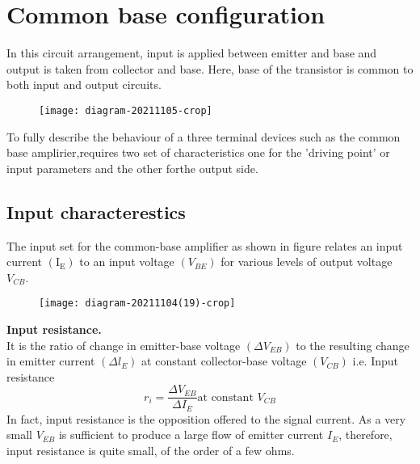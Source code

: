  \section{Common base configuration}
 In this circuit arrangement, input is applied between emitter and base and output is taken from collector and base. Here, base of the transistor is common to both input and output circuits.\\
\begin{figure}[H]
	\centering
	\texttt{[image: diagram-20211105-crop]}
	\caption{}
	\label{}
\end{figure}
 To fully describe the behaviour of a three terminal devices such as the common base amplirier,requires two set of characteristics one for the 'driving point' or input parameters and the other forthe output side.
 \subsection{Input characterestics}
 The input set for the common-base amplifier as shown in figure relates an input current $\left(\mathrm{I}_{\mathrm{E}}\right)$ to an input voltage $\left(V_{B E}\right)$ for various levels of output voltage $V_{C B}$.\\
 \begin{figure}[H]
 	\centering
 	\texttt{[image: diagram-20211104(19)-crop]}
 	\caption{}
 	\label{}
 \end{figure}
 \textbf{Input resistance.}\\
  It is the ratio of change in emitter-base voltage $\left(\Delta V_{E B}\right)$ to the resulting change in emitter current $\left(\Delta l_{E}\right)$ at constant collector-base voltage $\left(V_{C B}\right)$ i.e.
 Input resistance
  $$r_{i}=\frac{\Delta V_{E B}}{\Delta I_{E}} \text{at constant } V_{C B}$$
 In fact, input resistance is the opposition offered to the signal current. As a very small $V_{E B}$ is sufficient to produce a large flow of emitter current $I_{E}$, therefore, input resistance is quite small, of the order of a few ohms.
